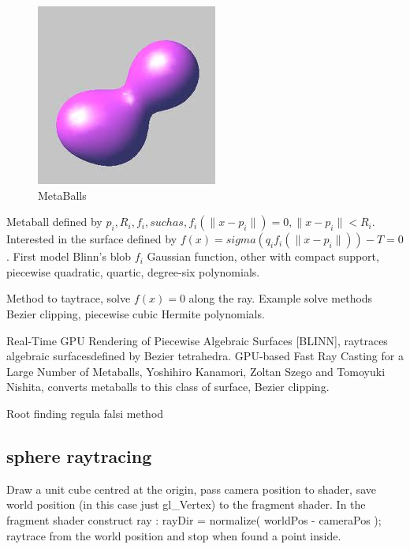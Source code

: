 \documentclass[11pt]{article}
\numberwithin{figure}{section}
\begin{document}
\maketitle


\begin{figure}[!h!]
\centering
\includegraphics[scale=0.5]{../pictures/meta.jpg}
\caption{MetaBalls}
\label{bilb}
\end{figure}

Metaball defined by $p_i, R_i, f_i, such as, f_i(\|x-p_i\|)=0,\|x-p_i\|<R_i$.
Interested in the surface defined by $f(x)=sigma( q_i f_i(\|x-p_i\|)  ) - T = 0$.
First model Blinn's blob $f_i$ Gaussian function, other with compact support, piecewise quadratic, quartic, degree-six polynomials.

Method to taytrace, solve $f(x)=0$ along the ray. Example solve methods Bezier clipping, piecewise cubic Hermite polynomials.


Real-Time GPU Rendering of Piecewise Algebraic Surfaces [BLINN], raytraces algebraic surfacesdefined by Bezier tetrahedra.
GPU-based Fast Ray Casting for a Large Number of Metaballs, Yoshihiro Kanamori, Zoltan Szego and Tomoyuki Nishita, converts metaballs to this class of surface, Bezier clipping.

Root finding regula falsi method

\subsection{sphere raytracing}
Draw a unit cube centred at the origin, pass camera position to shader, save world position (in this case just gl_Vertex) to the fragment shader.
In the fragment shader construct ray : rayDir = normalize( worldPos - cameraPos );
raytrace from the world position and stop when found a point inside.
\end{document}
